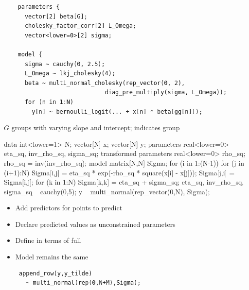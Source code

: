 \documentclass[10pt]{report}
\begin{document}
%
\vspace*{-4pt}
{\footnotesize
\begin{Verbatim}
    parameters {
      vector[2] beta[G];
      cholesky_factor_corr[2] L_Omega;
      vector<lower=0>[2] sigma;

    model {
      sigma ~ cauchy(0, 2.5);
      L_Omega ~ lkj_cholesky(4);
      beta ~ multi_normal_cholesky(rep_vector(0, 2),
                             diag_pre_multiply(sigma, L_Omega));
      for (n in 1:N)
        y[n] ~ bernoulli_logit(... + x[n] * beta[gg[n]]);
\end{Verbatim}
}
\vspace*{6pt}
\begin{subitemize}
\item $G$ groups with varying slope and intercept;  indicates group
\end{subitemize}


%
\vspace*{-5pt}
\begin{stancode}
data {
  int<lower=1> N;  vector[N] x; vector[N] y;
} parameters {
  real<lower=0> eta_sq, inv_rho_sq, sigma_sq;
} transformed parameters {
  real<lower=0> rho_sq; rho_sq = inv(inv_rho_sq);
} model {
  matrix[N,N] Sigma;
  for (i in 1:(N-1)) {
    for (j in (i+1):N) {
      Sigma[i,j] = eta_sq * exp(-rho_sq * square(x[i] - x[j]));
      Sigma[j,i] = Sigma[i,j];
  }}
  for (k in 1:N) Sigma[k,k] = eta_sq + sigma_sq;
  eta_sq, inv_rho_sq, sigma_sq ~ cauchy(0,5);
  y ~ multi_normal(rep_vector(0,N), Sigma);
}
\end{stancode}


%
\begin{itemize}
\item Add predictors  for points to predict
\item Declare predicted values  as unconstrained parameters
\item Define  in terms of full 
\item Model remains the same
{\small
\begin{Verbatim}
 append_row(y,y_tilde)
   ~ multi_normal(rep(0,N+M),Sigma);
\end{Verbatim}
}
\end{itemize}
\end{document}

